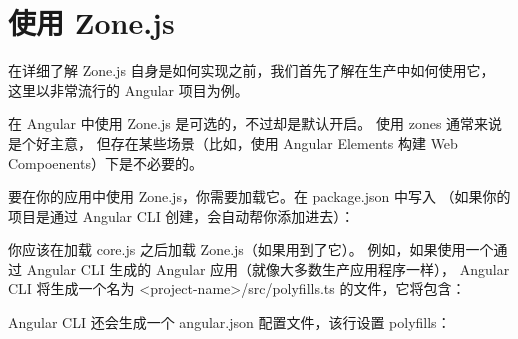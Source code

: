 \section{使用 Zone.js}


在详细了解 Zone.js 自身是如何实现之前，我们首先了解在生产中如何使用它，
这里以非常流行的 Angular 项目为例。


在 Angular 中使用 Zone.js 是可选的，不过却是默认开启。
使用 zones 通常来说是个好主意，
但存在某些场景（比如，使用 Angular Elements 构建 Web Compoenents）下是不必要的。


要在你的应用中使用 Zone.js，你需要加载它。在 package.json 中写入
（如果你的项目是通过 Angular CLI 创建，会自动帮你添加进去）：




你应该在加载 core.js 之后加载 Zone.js（如果用到了它）。
例如，如果使用一个通过 Angular CLI 生成的 Angular 应用（就像大多数生产应用程序一样），
Angular CLI 将生成一个名为 <project-name>/src/polyfills.ts 的文件，它将包含：




Angular CLI 还会生成一个 angular.json 配置文件，该行设置 polyfills：

